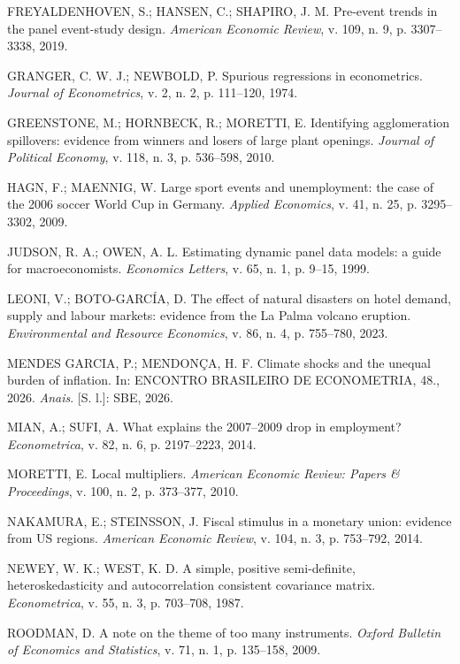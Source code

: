 \documentclass[12pt,a4paper]{article}
\begin{document}
\begin{singlespace}
FREYALDENHOVEN, S.; HANSEN, C.; SHAPIRO, J. M. Pre-event trends in the panel event-study design.
\textit{American Economic Review}, v. 109, n. 9, p. 3307--3338, 2019.

GRANGER, C. W. J.; NEWBOLD, P. Spurious regressions in econometrics. \textit{Journal of
Econometrics}, v. 2, n. 2, p. 111--120, 1974.

GREENSTONE, M.; HORNBECK, R.; MORETTI, E. Identifying agglomeration spillovers: evidence from
winners and losers of large plant openings. \textit{Journal of Political Economy}, v. 118, n. 3,
p. 536--598, 2010.

HAGN, F.; MAENNIG, W. Large sport events and unemployment: the case of the 2006 soccer World Cup in
Germany. \textit{Applied Economics}, v. 41, n. 25, p. 3295--3302, 2009.

JUDSON, R. A.; OWEN, A. L. Estimating dynamic panel data models: a guide for macroeconomists.
\textit{Economics Letters}, v. 65, n. 1, p. 9--15, 1999.

LEONI, V.; BOTO-GARCÍA, D. The effect of natural disasters on hotel demand, supply and labour
markets: evidence from the La Palma volcano eruption. \textit{Environmental and Resource Economics},
v. 86, n. 4, p. 755--780, 2023.

MENDES GARCIA, P.; MENDONÇA, H. F. Climate shocks and the unequal burden of inflation. In: ENCONTRO
BRASILEIRO DE ECONOMETRIA, 48., 2026. \textit{Anais}. [S. l.]: SBE, 2026.

MIAN, A.; SUFI, A. What explains the 2007--2009 drop in employment? \textit{Econometrica}, v. 82,
n. 6, p. 2197--2223, 2014.

MORETTI, E. Local multipliers. \textit{American Economic Review: Papers \& Proceedings}, v. 100,
n. 2, p. 373--377, 2010.

NAKAMURA, E.; STEINSSON, J. Fiscal stimulus in a monetary union: evidence from US regions.
\textit{American Economic Review}, v. 104, n. 3, p. 753--792, 2014.

NEWEY, W. K.; WEST, K. D. A simple, positive semi-definite, heteroskedasticity and autocorrelation
consistent covariance matrix. \textit{Econometrica}, v. 55, n. 3, p. 703--708, 1987.

ROODMAN, D. A note on the theme of too many instruments. \textit{Oxford Bulletin of Economics and
Statistics}, v. 71, n. 1, p. 135--158, 2009.
\end{singlespace}
\end{document}
